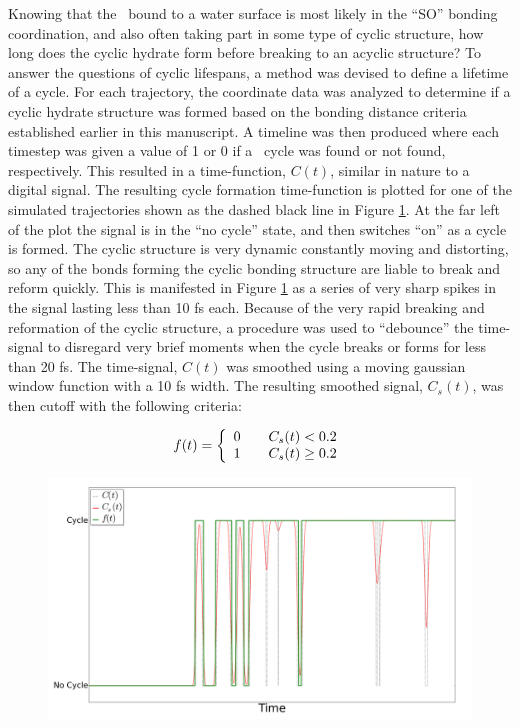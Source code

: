 Knowing that the \suldiox~bound to a water surface is most likely in the ``SO'' bonding coordination, and also often taking part in some type of cyclic structure, how long does the cyclic hydrate form before breaking to an acyclic structure? To answer the questions of cyclic lifespans, a method was devised to define a lifetime of a cycle. For each trajectory, the coordinate data was analyzed to determine if a cyclic hydrate structure was formed based on the bonding distance criteria established earlier in this manuscript. A timeline was then produced where each timestep was given a value of 1 or 0 if a \suldiox~cycle was found or not found, respectively. This resulted in a time-function, $C(t)$, similar in nature to a digital signal. The resulting cycle formation time-function is plotted for one of the simulated trajectories shown as the dashed black line in Figure \ref{fig:debouncing}. At the far left of the plot the signal is in the ``no cycle'' state, and then switches ``on'' as a cycle is formed. The cyclic structure is very dynamic constantly moving and distorting, so any of the bonds forming the cyclic bonding structure are liable to break and reform quickly. This is manifested in Figure \ref{fig:debouncing} as a series of very sharp spikes in the signal lasting less than 10 fs each. Because of the very rapid breaking and reformation of the cyclic structure, a procedure was used to ``debounce'' the time-signal to disregard very brief moments when the cycle breaks or forms for less than 20 fs. The time-signal, $C(t)$ was smoothed using a moving gaussian window function with a 10 fs width. The resulting smoothed signal, $C_s(t)$, was then cutoff with the following criteria:

\[
  f(t) = \left\{ 
  \begin{array}{l l}
    0 & \quad C_s(t) < 0.2\\
    1 & \quad C_s(t) \geq 0.2\\
  \end{array} \right.
\]

\begin{figure}[h!]
	\begin{center}
		\includegraphics[scale=1.0]{images/cycles/cycle-debouncing-small.png}
		\caption{}
		\label{fig:debouncing}
	\end{center}
\end{figure}
